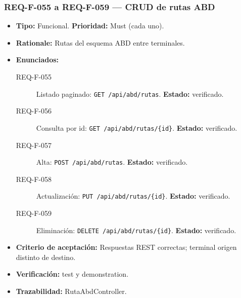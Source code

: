 \documentclass[12pt,a4paper]{article}
\begin{document}
\subsubsection{REQ-F-055 a REQ-F-059 --- CRUD de rutas ABD}
\begin{itemize}
  \item \textbf{Tipo:} Funcional. \textbf{Prioridad:} Must (cada uno).
  \item \textbf{Rationale:} Rutas del esquema ABD entre terminales.
  \item \textbf{Enunciados:}
    \begin{description}
      \item[REQ-F-055] Listado paginado: \texttt{GET /api/abd/rutas}. \textbf{Estado:} verificado.
      \item[REQ-F-056] Consulta por id: \texttt{GET /api/abd/rutas/\{id\}}. \textbf{Estado:} verificado.
      \item[REQ-F-057] Alta: \texttt{POST /api/abd/rutas}. \textbf{Estado:} verificado.
      \item[REQ-F-058] Actualización: \texttt{PUT /api/abd/rutas/\{id\}}. \textbf{Estado:} verificado.
      \item[REQ-F-059] Eliminación: \texttt{DELETE /api/abd/rutas/\{id\}}. \textbf{Estado:} verificado.
    \end{description}
  \item \textbf{Criterio de aceptación:} Respuestas REST correctas; terminal origen distinto de destino.
  \item \textbf{Verificación:} test y demonstration.
  \item \textbf{Trazabilidad:} RutaAbdController.
\end{itemize}
\end{document}
